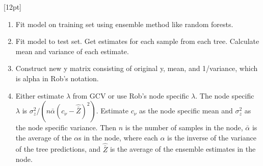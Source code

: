 [12pt]



\begin{enumerate}
\item Fit model on training set using ensemble method like random
forests.
\item Fit model to test set.  Get estimates for each sample from each
tree.  Calculate mean and variance of each estimate.
\item Construct new y matrix consisting of original y, mean, and
1/variance, which is alpha in Rob's notation.
\item Either estimate $\lambda$ from GCV or use Rob's node specific
  $\lambda$.  The node specific $\lambda$ is $\sigma^2_z/(n
  \bar{\alpha} (c_{\nu}-\hat{\bar{Z}})^2)$.  Estimate $c_{\nu}$ as the
  node specific mean and $\sigma^2_z$ as the node specific variance.
  Then $n$ is the number of samples in the node, $\bar{\alpha}$ is the
  average of the $\alpha$s in the node, where each $\alpha$ is the
  inverse of the variance of the tree predictions, and $\hat{\bar{Z}}$
  is the average of the ensemble estimates in the node.
\end{enumerate}




